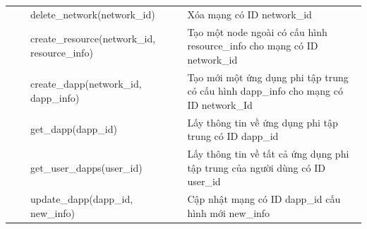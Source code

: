 \documentclass[../DoAn.tex]{subfiles}
\begin{document}
\begin{longtable}{|p{}|p{}|p{}|p{}|}
                                                   &                                                                                    & \hspace{0pt}delete\_network\hspace{0pt}(network\_id)                              & Xóa mạng có ID network\_id                                                                   \\ \cline{3-4}
                                                   &                                                                                    & \hspace{0pt}create\_resource\hspace{0pt}(network\_id, resource\_info)             & Tạo một node ngoài có cấu hình resource\_info cho mạng có ID network\_id                     \\ \cline{3-4}
                                                   &                                                                                    & \hspace{0pt}create\_dapp\hspace{0pt}(network\_id, dapp\_info)                     & Tạo mới một ứng dụng phi tập trung có cấu hình dapp\_info cho mạng có ID network\_Id         \\ \cline{3-4}
                                                   &                                                                                    & \hspace{0pt}get\_dapp\hspace{0pt}(dapp\_id)                                       & Lấy thông tin về ứng dụng phi tập trung có ID dapp\_id                                       \\ \cline{3-4}
                                                   &                                                                                    & \hspace{0pt}get\_user\_dapps\hspace{0pt}(user\_id)                                & Lấy thông tin về tất cả ứng dụng phi tập trung của người dùng có ID user\_id                 \\ \cline{3-4}
                                                   &                                                                                    & \hspace{0pt}update\_dapp\hspace{0pt}(dapp\_id, new\_info)                         & Cập nhật mạng có ID dapp\_id cấu hình mới new\_info                                          \\ \cline{3-4}

\end{longtable}
\end{document}
